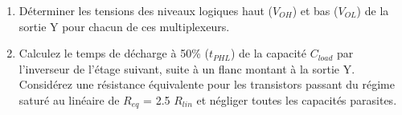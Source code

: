 \begin{enumerate}
	\item Déterminer les tensions des niveaux logiques haut ($V_{OH}$) et bas ($V_{OL}$) de
	la sortie Y pour chacun de ces multiplexeurs.
	\item Calculez le temps de décharge à 50\% ($t_{PHL}$) de la capacité $C_{load}$ par
	l'inverseur de l'étage suivant, suite à un flanc montant à la sortie Y. Considérez une
	résistance équivalente pour les transistors passant du régime saturé au linéaire de
	$R_{eq}$ = 2.5 $R_{lin}$ et négliger toutes les capacités parasites.
\end{enumerate}